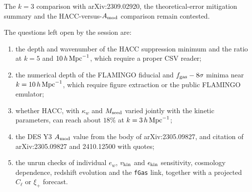 \documentclass[11pt,a4paper]{article}
\begin{document}
The $k=3$ comparison with arXiv:2309.02920, the theoretical-error mitigation summary and the HACC-versus-$A_{\rm mod}$ comparison remain contested.

The questions left open by the session are:
\begin{enumerate}
\item the depth and wavenumber of the HACC suppression minimum and the ratio at $k=5$ and $10\,h\,{\rm Mpc}^{-1}$, which require a proper CSV reader;
\item the numerical depth of the FLAMINGO fiducial and $f_{\rm gas}-8\sigma$ minima near $k=10\,h\,{\rm Mpc}^{-1}$, which require figure extraction or the public FLAMINGO emulator;
\item whether HACC, with $\kappa_w$ and $M_{\rm seed}$ varied jointly with the kinetic parameters, can reach about $18\%$ at $k=3\,h\,{\rm Mpc}^{-1}$;
\item the DES Y3 $A_{\rm mod}$ value from the body of arXiv:2305.09827, and citation of arXiv:2305.09827 and 2410.12500 with quotes;
\item the unrun checks of individual $e_w$, $v_{\rm kin}$ and $\epsilon_{\rm kin}$ sensitivity, cosmology dependence, redshift evolution and the \texttt{fGas} link, together with a projected $C_\ell$ or $\xi_+$ forecast.
\end{enumerate}
\end{document}

